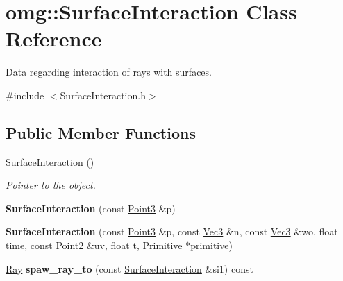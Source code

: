 \hypertarget{classomg_1_1_surface_interaction}{}\section{omg\+::Surface\+Interaction Class Reference}
\label{classomg_1_1_surface_interaction}


Data regarding interaction of rays with surfaces.  




{\ttfamily \#include $<$Surface\+Interaction.\+h$>$}

\subsection*{Public Member Functions}
\begin{DoxyCompactItemize}
\item 
\mbox{\label{classomg_1_1_surface_interaction_aa82edbc25acb336efceaf183d8269341}} 
\mbox{\hyperlink{classomg_1_1_surface_interaction_aa82edbc25acb336efceaf183d8269341}{Surface\+Interaction}} ()
\begin{DoxyCompactList}\small\item\em Pointer to the object. \end{DoxyCompactList}\item 
\mbox{\label{classomg_1_1_surface_interaction_ab21a4ce75d80f52e2e99d097561f9ac7}} 
{\bfseries Surface\+Interaction} (const \mbox{\hyperlink{namespaceomg_af85242d35fdacf829d32a6f9b95f3e35}{Point3}} \&p)
\item 
\mbox{\label{classomg_1_1_surface_interaction_ae72da560f03a1843f9c7df69000a436a}} 
{\bfseries Surface\+Interaction} (const \mbox{\hyperlink{namespaceomg_af85242d35fdacf829d32a6f9b95f3e35}{Point3}} \&p, const \mbox{\hyperlink{namespaceomg_a45a9482677fee9933ff369b49894e316}{Vec3}} \&n, const \mbox{\hyperlink{namespaceomg_a45a9482677fee9933ff369b49894e316}{Vec3}} \&wo, float time, const \mbox{\hyperlink{namespaceomg_a18e42fb7bbc4159e9137145b866ec578}{Point2}} \&uv, float t, \mbox{\hyperlink{classomg_1_1_primitive}{Primitive}} $\ast$primitive)
\item 
\mbox{\label{classomg_1_1_surface_interaction_a9f27a9323990fa9a84dd670fa1a56a48}} 
\mbox{\hyperlink{classomg_1_1_ray}{Ray}} {\bfseries spaw\+\_\+ray\+\_\+to} (const \mbox{\hyperlink{classomg_1_1_surface_interaction}{Surface\+Interaction}} \&si1) const
\end{DoxyCompactItemize}
